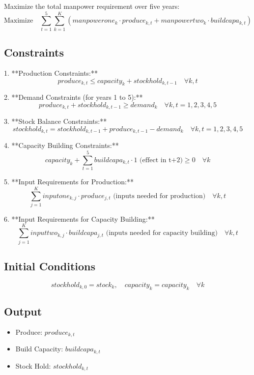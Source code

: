 \documentclass{article}
\begin{document}
Maximize the total manpower requirement over five years:
\[
\text{Maximize} \quad \sum_{t=1}^{5} \sum_{k=1}^{K} \left( manpowerone_{k} \cdot produce_{k,t} + manpowertwo_{k} \cdot buildcapa_{k,t} \right)
\]

\subsection*{Constraints}

1. **Production Constraints:**
   \[
   produce_{k,t} \leq capacity_{k} + stockhold_{k,t-1} \quad \forall k, t
   \]

2. **Demand Constraints (for years 1 to 5):**
   \[
   produce_{k,t} + stockhold_{k,t-1} \geq demand_{k} \quad \forall k, t = 1, 2, 3, 4, 5
   \]

3. **Stock Balance Constraints:**
   \[
   stockhold_{k,t} = stockhold_{k,t-1} + produce_{k,t-1} - demand_{k} \quad \forall k, t = 1, 2, 3, 4, 5
   \]

4. **Capacity Building Constraints:**
   \[
   capacity_{k} + \sum_{t=1}^{5} buildcapa_{k,t} \cdot 1 \text{ (effect in t+2)} \geq 0 \quad \forall k
   \]

5. **Input Requirements for Production:**
   \[
   \sum_{j=1}^{K} inputone_{k,j} \cdot produce_{j,t} \text{ (inputs needed for production)} \quad \forall k, t
   \]

6. **Input Requirements for Capacity Building:**
   \[
   \sum_{j=1}^{K} inputtwo_{k,j} \cdot buildcapa_{j,t} \text{ (inputs needed for capacity building)} \quad \forall k, t
   \]

\subsection*{Initial Conditions}
\[
stockhold_{k,0} = stock_{k}, \quad capacity_{k} = capacity_{k} \quad \forall k
\]

\subsection*{Output}
\begin{itemize}
    \item Produce: \( produce_{k,t} \)
    \item Build Capacity: \( buildcapa_{k,t} \)
    \item Stock Hold: \( stockhold_{k,t} \)
\end{itemize}
\end{document}
